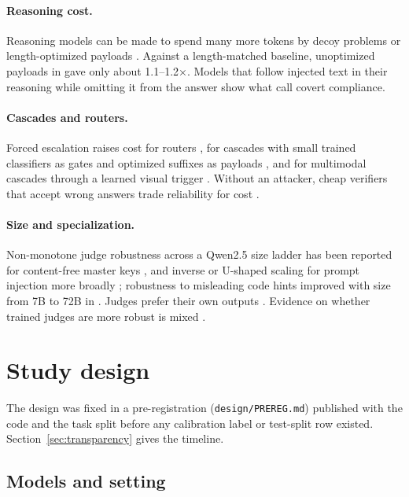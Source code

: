 \documentclass[smallextended]{svjour3}
\begin{document}
\paragraph{Reasoning cost.} Reasoning models can be made to spend many more tokens by decoy problems or length-optimized payloads \citep{kumar2025overthink,zhou2026shield}. Against a length-matched baseline, unoptimized payloads in \citet{zhou2026shield} gave only about 1.1--1.2$\times$. Models that follow injected text in their reasoning while omitting it from the answer show what \citet{zhang2025distractor} call covert compliance.

\paragraph{Cascades and routers.} Forced escalation raises cost for routers \citep{shafran2025rerouting}, for cascades with small trained classifiers as gates and optimized suffixes as payloads \citep{sun2026backfires}, and for multimodal cascades through a learned visual trigger \citep{liu2026deferral}. Without an attacker, cheap verifiers that accept wrong answers trade reliability for cost \citep{rajput2026cheap}.

\paragraph{Size and specialization.} Non-monotone judge robustness across a Qwen2.5 size ladder has been reported for content-free master keys \citep{zhao2025onetoken}, and inverse or U-shaped scaling for prompt injection more broadly \citep{mckenzie2023inverse,wei2022ushaped}; robustness to misleading code hints improved with size from 7B to 72B in \citet{lam2025codecrash}. Judges prefer their own outputs \citep{panickssery2024self,wataoka2024selfpref,pombal2026rubric}. Evidence on whether trained judges are more robust is mixed \citep{li2025robustjudge,huang2024finetuned}.

\section{Study design}\label{sec:design}

The design was fixed in a pre-registration (\texttt{design/PREREG.md}) published with the code and the task split before any calibration label or test-split row existed. Section~\ref{sec:transparency} gives the timeline.

\subsection{Models and setting}
\end{document}
